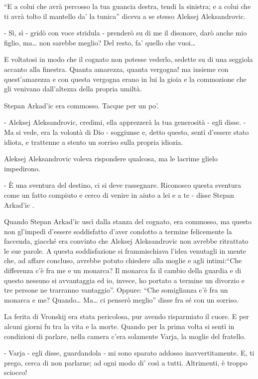 ``E a colui che avrà percosso la tua guancia destra, tendi la sinistra; e a colui che ti avrà tolto il mantello da' la tunica'' diceva a se stesso Aleksej Aleksandrovic. 

- Sì, sì - gridò con voce stridula - prenderò su di me il disonore, darò anche mio figlio, ma\ldots{} non sarebbe meglio? Del resto, fa' quello che vuoi\ldots{} 

E voltatosi in modo che il cognato non potesse vederlo, sedette su di una seggiola accanto alla finestra. Quanta amarezza, quanta vergogna! ma insieme con quest'amarezza e con questa vergogna erano in lui la gioia e la commozione che gli venivano dall'altezza della propria umiltà. 

Stepan Arkad'ic era commosso. Tacque per un po'. 

- Aleksej Aleksandrovic, credimi, ella apprezzerà la tua generosità - egli disse. - Ma si vede, era la volontà di Dio - soggiunse e, detto questo, sentì d'essere stato idiota, e trattenne a stento un sorriso sulla propria idiozia. 

Aleksej Aleksandrovic voleva rispondere qualcosa, ma le lacrime glielo impedirono. 

- È una sventura del destino, ci si deve rassegnare. Riconosco questa sventura come un fatto compiuto e cerco di venire in aiuto a lei e a te - disse Stepan Arkad'ic . 

Quando Stepan Arkad'ic uscì dalla stanza del cognato, era commosso, ma questo non gl'impedì d'essere soddisfatto d'aver condotto a termine felicemente la faccenda, giacché era convinto che Aleksej Aleksandrovic non avrebbe ritrattato le sue parole. A questa soddisfazione si frammischiava l'idea venutagli in mente che, ad affare concluso, avrebbe potuto chiedere alla moglie e agli intimi:``Che differenza c'è fra me e un monarca? Il monarca fa il cambio della guardia e di questo nessuno si avvantaggia ed io, invece, ho portato a termine un divorzio e tre persone ne trarranno vantaggio''. Oppure: ``Che somiglianza c'è fra un monarca e me? Quando\ldots{} Ma\ldots{} ci penserò meglio'' disse fra sé con un sorriso. 

\label{xxiii-3} 

La ferita di Vronskij era stata pericolosa, pur avendo risparmiato il cuore. E per alcuni giorni fu tra la vita e la morte. Quando per la prima volta si sentì in condizioni di parlare, nella camera c'era solamente Varja, la moglie del fratello. 

- Varja - egli disse, guardandola - mi sono sparato addosso inavvertitamente. E, ti prego, cerca di non parlarne; ad ogni modo di' così a tutti. Altrimenti, è troppo sciocco! 

